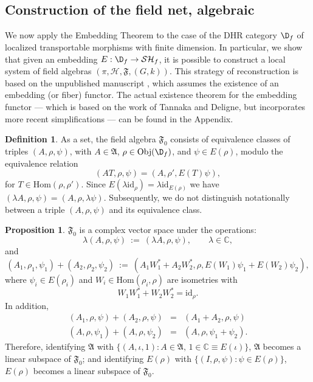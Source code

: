 \documentclass[12pt]{article}
\newcommand{\alg}[1]{\mathfrak{#1}}
\theoremstyle{definition}
\newtheorem{prop}[thm]{Proposition}
\theoremstyle{definition}
\newtheorem{defn}[thm]{Definition}
\theoremstyle{remark}
\newcommand{\Obj}{\mathrm{Obj}}
\def\2#1{{\mathcal #1}}
\def\7#1{{\mathbb #1}}
\newcommand{\Hom}{\mathrm{Hom}}
\def\id{\mathrm{id}}
\newcommand{\fields}{(\pi ,\2H ,\alg{F},(G,k))}
\begin{document}
\subsection{Construction of the field net, algebraic} \label{ss-Falg}

We now apply the Embedding Theorem to the case of the DHR category $\D
_f$ of localized transportable morphisms with finite dimension.  In
particular, we show that given an embedding $E:\D _f\to \2S\2H_f$, it
is possible to construct a local system of field algebras $\fields$.
This strategy of reconstruction is based on the unpublished manuscript
\cite{problem}, which assumes the existence of an embedding (or fiber)
functor.  The actual existence theorem for the embedding functor ---
which is based on the work of Tannaka and Deligne, but incorporates
more recent simplifications --- can be found in the Appendix.

\begin{defn} As a set, the field algebra $\alg{F}_0 $
  consists of equivalence classes of triples $(A,\rho
  ,\psi)$, with $A\in \alg{A}$, $\rho \in \Obj (\D
  _f)$, and $\psi \in E(\rho )$, modulo the equivalence
  relation
$$ (AT,\rho ,\psi )=(A,\rho ',E(T)\psi ) ,$$
for $T\in \Hom (\rho ,\rho ')$.  Since $E(\lambda \id _{\rho})=\lambda \id _{E(\rho
  )}$ we have $(\lambda A,\rho ,\psi )=(A,\rho ,\lambda \psi )$.  Subsequently, we do
not distinguish notationally between a triple $(A,\rho ,\psi )$ and its equivalence
class.
\end{defn}

\begin{prop} $\alg{F}_0 $ is a complex vector space under the operations:
  \begin{equation} \lambda (A,\rho ,\psi )\: := \:(\lambda A,\rho ,\psi ) ,\qquad
    \lambda \in \7C ,\end{equation} and
  \begin{equation} (A_1,\rho _1,\psi_1)+(A_2,\rho _2,\psi _2)\: :=
    \:(A_1W_1^*+A_2W_2^*,\rho ,E(W_1)\psi _1+E(W_2)\psi _2), \label{addition}
  \end{equation} where $\psi _i\in E(\rho _i)$ and $W_i\in \Hom (\rho _i ,\rho )$ are
  isometries with
  \begin{equation} W_1W_1^*+W_2W_2^*=\id _\rho .\end{equation} In addition,  
  \begin{eqnarray*} (A_1,\rho ,\psi )+(A_2,\rho ,\psi )&=&(A_1+A_2,\rho ,\psi ) \\
    (A,\rho ,\psi _1)+(A,\rho ,\psi _2) &=&(A,\rho ,\psi _1+\psi _2) .\end{eqnarray*}
  Therefore, identifying $\alg{A}$ with $\{ (A,\iota ,1):A\in \alg{A}, \, 1\in
  \7C\equiv E(\iota )\}$, $\alg{A}$ becomes a linear subspace of $\alg{F}_0 $; and
  identifying $E(\rho)$ with $\{ (I,\rho ,\psi ):\psi \in E(\rho )\}$, $E(\rho )$
  becomes a linear subspace of $\alg{F}_0$.
\label{linear-space}
\end{prop}
\end{document}
